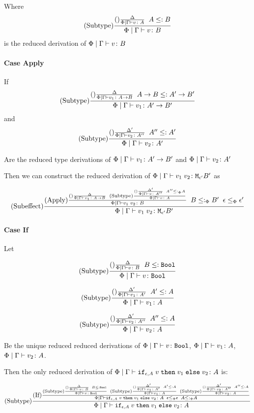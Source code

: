 \documentclass{report}
\newcommand\edeltavrule[5]{\deltavrule{#1 \mid #2}{#3}{#4}{#5}}
\newcommand{\edeltavruleprime}[5]{
        \deltavruleprime{#1\mid #2}{#3}{#4}{#5}}
\newcommand{\edeltavruleprimeprime}[5]{
        \deltavruleprimeprime{#1\mid #2}{#3}{#4}{#5}}
\begin{document}
Where $$\edeltavrule{\P}{\G}{v}{A}{B}$$ is the reduced derivation of $\Phi\mid\Gamma \vdash v \colon B$

\paragraph{Case Apply}
If 
$$
    \edeltavrule{\P}{\G}{v_1}{\ab}{\fntype{A'}{B'}}
$$ and $$
    \edeltavruleprime{\P}{\G}{v_2}{A''}{A'}
$$

Are the reduced type derivations of $\Phi\mid\Gamma \vdash v_1 \colon A'\rightarrow B'$ and $\Phi\mid\Gamma \vdash v_2 \colon A'$



Then we can construct the reduced derivation of $\Phi\mid\Gamma \vdash v_1\; v_2 \colon \texttt{M}_{\epsilon'}{B'}$ as

$$
    (\text{Subeffect}) \frac{
        (\text{Apply}) \frac{
            (\text{}) \frac{\Delta}{
                \Phi\mid\Gamma \vdash v_1 \colon A\rightarrow B
            }
            \;\;
            (\text{Subtype}) \frac{
                (\text{}) \frac{\Delta'}{
                    \Phi\mid\Gamma \vdash v \colon A''
                } \;\; A'' \leq:_\Phi A
            }{\Phi\mid\Gamma \vdash v \colon A}
        }{
            \Phi\mid\Gamma \vdash v_1\; v_2 \colon B
        }
        \;\;
        B \leq:_\Phi B'
        \;\;
        \epsilon \leq_{\Phi} \epsilon'
    }{
        \Phi\mid\Gamma \vdash v_1\; v_2 \colon \texttt{M}_{\epsilon'}{B'}
    }
$$
\paragraph{Case If}
Let

\begin{equation}
    \edeltavrule{\P}{\G}{v}{B}{\B}
\end{equation}

\begin{equation}
    \edeltavruleprime{\P}{\G}{v_1}{A'}{A}
\end{equation}

\begin{equation}
    \edeltavruleprimeprime{\P}{\G}{v_2}{A''}{A}
\end{equation}

Be the unique reduced reduced derivations of $\Phi\mid\Gamma \vdash v \colon \texttt{Bool}$, $\Phi\mid\Gamma \vdash v_1 \colon A$, $\Phi\mid\Gamma \vdash v_2 \colon A$.

Then the only reduced derivation of $\Phi\mid\Gamma \vdash \texttt{if}_{\epsilon, A}\; v\; \texttt{then}\; v_1 \;\texttt{else} \; v_2 \colon A$ is:

\begin{equation}
    \treerule{Subtype}{
        \treerule{If}{
            \edeltavrule{\P}{\G}{v}{B}{\B}
            \s\s
            \edeltavruleprime{\P}{\G}{v_1}{A'}{A}
            \s\s
            \edeltavruleprimeprime{\P}{\G}{v_2}{A''}{A}
        }{\gpetyperelation{\ifthenelse{\e}{A}{v}{v_1}{v_2}}{A}\s\s \e\subeffectp \e\s\s A \subtypep A}
    }{\gpetyperelation{\ifthenelse{\e}{A}{v}{v_1}{v_2}}{A}}
\end{equation}
\end{document}
